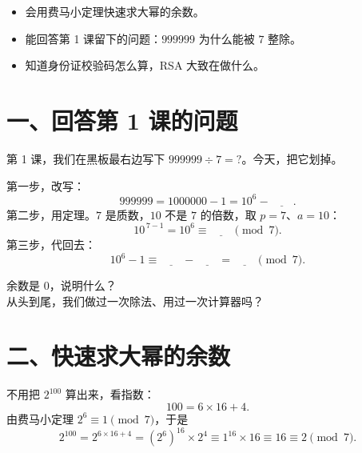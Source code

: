 

\begin{mubiao}
  \begin{itemize}
    \item 会用费马小定理快速求大幂的余数。
    \item 能回答第 1 课留下的问题：\(999999\) 为什么能被 \(7\) 整除。
    \item 知道身份证校验码怎么算，RSA 大致在做什么。
  \end{itemize}
\end{mubiao}

\section*{一、回答第 1 课的问题}

\noindent 第 1 课，我们在黑板最右边写下 \(999999\div7=?\)。今天，把它划掉。

\begin{dongshou}[一步一步写]
  第一步，改写：
  \[
    999999=1000000-1=10^{6}-\underline{\hspace{2em}} .
  \]
  第二步，用定理。\(7\) 是质数，\(10\) 不是 \(7\) 的倍数，取 \(p=7\)、\(a=10\)：
  \[
    10^{\,7-1}=10^{6}\equiv\underline{\hspace{2em}} \pmod 7 .
  \]
  第三步，代回去：
  \[
    10^{6}-1\equiv\underline{\hspace{2em}}-\underline{\hspace{2em}}
    =\underline{\hspace{2em}} \pmod 7 .
  \]
\end{dongshou}

\begin{sikao}
  余数是 \(0\)，说明什么？\\
  从头到尾，我们做过一次除法、用过一次计算器吗？
\end{sikao}

\section*{二、快速求大幂的余数}

\begin{example}[\(2^{100}\) 除以 \(7\)]
  不用把 \(2^{100}\) 算出来，看指数：
  \[
    100=6\times16+4 .
  \]
  由费马小定理 \(2^{6}\equiv1\pmod 7\)，于是
  \[
    2^{100}=2^{6\times16+4}=(2^{6})^{16}\times2^{4}
    \equiv1^{16}\times16\equiv16\equiv2 \pmod 7 .
  \]
\end{example}

